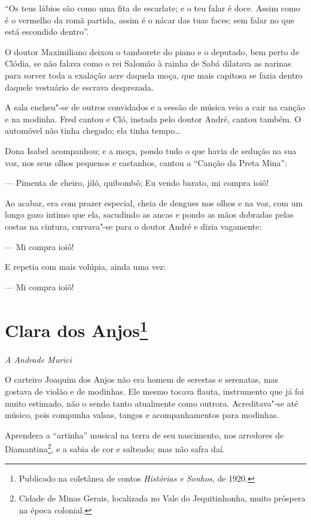 ``Os teus lábios são como uma fita de escarlate; e o teu falar é doce.
Assim como é o vermelho da romã partida, assim é o nácar das tuas faces;
sem falar no que está escondido dentro''.

O doutor Maximiliano deixou o tamborete do piano e o deputado, bem perto
de Clódia, se não falava como o rei Salomão à rainha de Sabá dilatava as
narinas para sorver toda a exalação acre daquela moça, que mais capitosa
se fazia dentro daquele vestuário de escrava desprezada.

A sala encheu"-se de outros convidados e a sessão de música veio a cair
na canção e na modinha. Fred cantou e Cló, instada pelo doutor André,
cantou também. O automóvel não tinha chegado; ela tinha tempo\ldots{}

Dona Isabel acompanhou; e a moça, pondo tudo o que havia de sedução na
sua voz, nos seus olhos pequenos e castanhos, cantou a ``Canção da Preta
Mina'':

--- Pimenta de cheiro, jiló, quibombô; Eu vendo barato, mi compra ioiô!

Ao acabar, era com prazer especial, cheia de dengues nos olhos e na voz,
com um longo gozo intimo que ela, sacudindo as ancas e pondo as mãos
dobradas pelas costas na cintura, curvava"-se para o doutor André e dizia
vagamente:

--- Mi compra ioiô!

E repetia com mais volúpia, ainda uma vez:

--- Mi compra ioiô!


\chapter[Clara dos Anjos]{Clara dos Anjos\footnote[*]{Publicado na coletânea de contos \emph{Histórias e Sonhos}, de 1920.}}

\hfill\emph{A Andrade Murici}\bigskip

\noindent{}O carteiro Joaquim dos Anjos não era homem de serestas e serenatas, mas
gostava de violão e de modinhas. Ele mesmo tocava flauta, instrumento
que já foi muito estimado, não o sendo tanto atualmente como outrora.
Acreditava"-se até músico, pois compunha valsas, tangos e acompanhamentos
para modinhas.

Aprendera a ``artinha'' musical na terra de seu nascimento, nos arredores
de Diamantina\footnote{Cidade de Minas Gerais, localizada no Vale do
  Jequitinhonha, muito próspera na época colonial.}, e a sabia de cor e
salteado; mas não safra daí.

